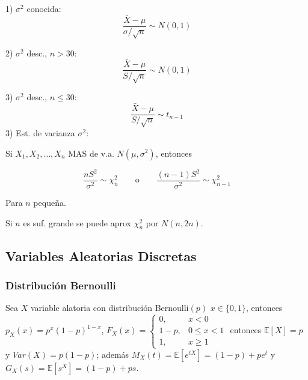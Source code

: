 \begin{Ejem}
1) $\sigma^2$ conocida:
\begin{equation}
\frac{\bar{X}-\mu}{\sigma/\sqrt{n}} \sim N(0,1)
\end{equation}

2) $\sigma^2$ desc., $n>30$:
\begin{equation}
\frac{\bar{X}-\mu}{S/\sqrt{n}} \sim N(0,1)
\end{equation}

3) $\sigma^2$ desc., $n\le 30$:
\begin{equation}
\frac{\bar{X}-\mu}{S/\sqrt{n}} \sim t_{n-1}
\end{equation}
3) Est. de varianza $\sigma^2$:

Si $X_1, X_2, \ldots, X_n$ MAS de v.a. $N(\mu,\sigma^2)$, entonces

\begin{equation}
\frac{nS^2}{\sigma^2} \sim \chi^2_n
\qquad \text{o} \qquad
\frac{(n-1)S^2}{\sigma^2} \sim \chi^2_{n-1}
\end{equation}

Para $n$ peque\~na.

Si $n$ es suf. grande se puede aprox $\chi^2_n$
por $N(n,2n)$.
\end{Ejem}




\subsection{Variables Aleatorias Discretas}

\subsubsection{Distribuci\'on Bernoulli}

\begin{Def} Sea $X$ variable alatoria con distribuci\'on Bernoulli$(p)$ $x \in \{0,1\}$,  entonces $p_X(x)=p^{x}(1-p)^{1-x}$,  $F_X(x) = \left\{
\begin{array}{cc}
0, & x<0 \\
1-p, & 0\leq x < 1 \\
1, & x \geq 1
\end{array}
\right. $ entonces $\mathbb{E}[X]=p$ y $Var(X) = p(1-p)$; adem\'as $M_X(t) = \mathbb{E}[e^{tX}] = (1-p) + pe^{t} $ y  $G_X(s) = \mathbb{E}[s^X] = (1-p) + ps$.
\end{Def}

